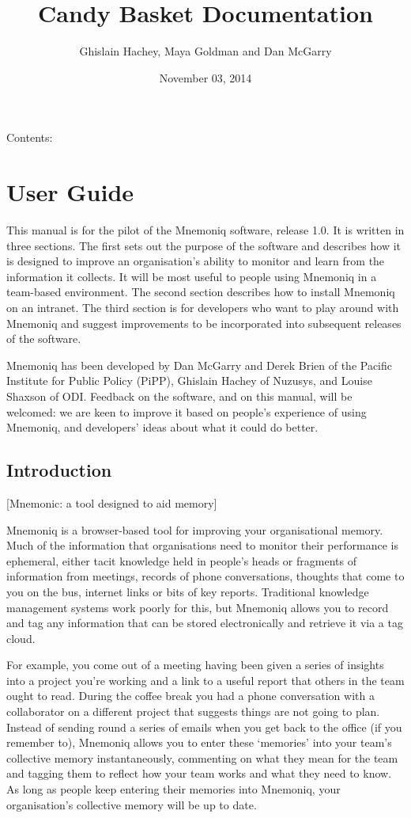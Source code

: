 \documentclass[letterpaper,10pt,english]{sphinxmanual}
\title{Candy Basket Documentation}
\date{November 03, 2014}
\author{Ghislain Hachey, Maya Goldman and Dan McGarry}
\begin{document}
\maketitle
\tableofcontents
{}\label{index::doc}


Contents:


\chapter{User Guide}
\label{user-guide:user-guide}\label{user-guide:candy-basket-s-documentation}\label{user-guide::doc}
This manual is for the pilot of the Mnemoniq software, release 1.0.
It is written in three sections.  The first sets out the purpose of
the software and describes how it is designed to improve an
organisation's ability to monitor and learn from the information it
collects.  It will be most useful to people using Mnemoniq in a
team-based environment.  The second section describes how to install
Mnemoniq on an intranet.  The third section is for developers who want
to play around with Mnemoniq and suggest improvements to be
incorporated into subsequent releases of the software.

Mnemoniq has been developed by Dan McGarry and Derek Brien of the
Pacific Institute for Public Policy (PiPP), Ghislain Hachey of
Nuzusys, and Louise Shaxson of ODI.  Feedback on the software, and on
this manual, will be welcomed: we are keen to improve it based on
people's experience of using Mnemoniq, and developers' ideas about
what it could do better.


\section{Introduction}
\label{user-guide:introduction}
{[}Mnemonic: a tool designed to aid memory{]}

Mnemoniq is a browser-based tool for improving your organisational
memory. Much of the information that organisations need to monitor
their performance is ephemeral, either tacit knowledge held in
people's heads or fragments of information from meetings, records of
phone conversations, thoughts that come to you on the bus, internet
links or bits of key reports.  Traditional knowledge management
systems work poorly for this, but Mnemoniq allows you to record and
tag any information that can be stored electronically and retrieve it
via a tag cloud.

For example, you come out of a meeting having been given a series of
insights into a project you're working and a link to a useful report
that others in the team ought to read. During the coffee break you had
a phone conversation with a collaborator on a different project that
suggests things are not going to plan.  Instead of sending round a
series of emails when you get back to the office (if you remember to),
Mnemoniq allows you to enter these `memories' into your team's
collective memory instantaneously, commenting on what they mean for
the team and tagging them to reflect how your team works and what they
need to know.  As long as people keep entering their memories into
Mnemoniq, your organisation's collective memory will be up to date.
\end{document}
